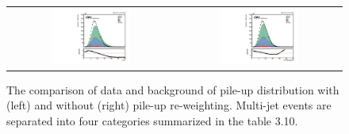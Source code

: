 \begin{figure}[t]
  \centering
  \begin{tabular}{cc}
    \includegraphics[width=0.5\textwidth]{Figures/dataMC_trig/nVtx.pdf} &
    \includegraphics[width=0.5\textwidth]{Figures/dataMC_trig/nVtxWeighted.pdf} \\
    
  \end{tabular}
  \caption{The comparison of data and background of pile-up distribution with (left) and without (right) pile-up re-weighting. Multi-jet events are separated into four categories summarized in the table 3.10.}
\end{figure}
